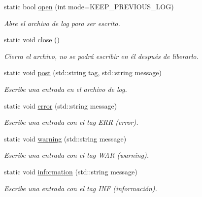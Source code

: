 \begin{DoxyCompactItemize}
\item 
static bool \hyperlink{class_e_s_e_1_1_log_a1c99ca7fcbbe1dc7c3452a23c424e702}{open} (int mode=K\-E\-E\-P\-\_\-\-P\-R\-E\-V\-I\-O\-U\-S\-\_\-\-L\-O\-G)
\begin{DoxyCompactList}\small\item\em Abre el archivo de log para ser escrito. \end{DoxyCompactList}\item 
\hypertarget{class_e_s_e_1_1_log_a604725d638e15ebc07d67b433671d9ae}{static void \hyperlink{class_e_s_e_1_1_log_a604725d638e15ebc07d67b433671d9ae}{close} ()}\label{class_e_s_e_1_1_log_a604725d638e15ebc07d67b433671d9ae}

\begin{DoxyCompactList}\small\item\em Cierra el archivo, no se podrá escribir en él después de liberarlo. \end{DoxyCompactList}\item 
static void \hyperlink{class_e_s_e_1_1_log_a9383493aa4fe986699af44f933ae0b1b}{post} (std\-::string tag, std\-::string message)
\begin{DoxyCompactList}\small\item\em Escribe una entrada en el archivo de log. \end{DoxyCompactList}\item 
static void \hyperlink{class_e_s_e_1_1_log_a7a97f99bd8fb2425cf82641c470f2914}{error} (std\-::string message)
\begin{DoxyCompactList}\small\item\em Escribe una entrada con el tag E\-R\-R (error). \end{DoxyCompactList}\item 
static void \hyperlink{class_e_s_e_1_1_log_abbd0b1b08fc6dc5a331a402b25aa3c01}{warning} (std\-::string message)
\begin{DoxyCompactList}\small\item\em Escribe una entrada con el tag W\-A\-R (warning). \end{DoxyCompactList}\item 
static void \hyperlink{class_e_s_e_1_1_log_a06a6956c153b3add127b76b4a9fa86c2}{information} (std\-::string message)
\begin{DoxyCompactList}\small\item\em Escribe una entrada con el tag I\-N\-F (información). \end{DoxyCompactList}\end{DoxyCompactItemize}



